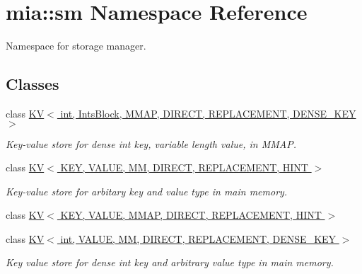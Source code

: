 \hypertarget{namespacemia_1_1sm}{\section{mia\-:\-:sm Namespace Reference}
\label{namespacemia_1_1sm}
}


Namespace for storage manager.  


\subsection*{Classes}
\begin{DoxyCompactItemize}
\item 
class \hyperlink{classmia_1_1sm_1_1_k_v_3_01int_00_01_ints_block_00_01_m_m_a_p_00_01_d_i_r_e_c_t_00_01_r_e_p_l_a_e377a0951ed37be3b4316b2929369f72}{K\-V$<$ int, Ints\-Block, M\-M\-A\-P, D\-I\-R\-E\-C\-T, R\-E\-P\-L\-A\-C\-E\-M\-E\-N\-T, D\-E\-N\-S\-E\-\_\-\-K\-E\-Y $>$}
\begin{DoxyCompactList}\small\item\em Key-\/value store for dense int key, variable length value, in M\-M\-A\-P. \end{DoxyCompactList}\item 
class \hyperlink{classmia_1_1sm_1_1_k_v_3_01_k_e_y_00_01_v_a_l_u_e_00_01_m_m_00_01_d_i_r_e_c_t_00_01_r_e_p_l_a_c_e_m_e_n_t_00_01_h_i_n_t_01_4}{K\-V$<$ K\-E\-Y, V\-A\-L\-U\-E, M\-M, D\-I\-R\-E\-C\-T, R\-E\-P\-L\-A\-C\-E\-M\-E\-N\-T, H\-I\-N\-T $>$}
\begin{DoxyCompactList}\small\item\em Key-\/value store for arbitary key and value type in main memory. \end{DoxyCompactList}\item 
class \hyperlink{classmia_1_1sm_1_1_k_v_3_01_k_e_y_00_01_v_a_l_u_e_00_01_m_m_a_p_00_01_d_i_r_e_c_t_00_01_r_e_p_l_2c35447e93d2a07c32ca67010a09264b}{K\-V$<$ K\-E\-Y, V\-A\-L\-U\-E, M\-M\-A\-P, D\-I\-R\-E\-C\-T, R\-E\-P\-L\-A\-C\-E\-M\-E\-N\-T, H\-I\-N\-T $>$}
\item 
class \hyperlink{classmia_1_1sm_1_1_k_v_3_01int_00_01_v_a_l_u_e_00_01_m_m_00_01_d_i_r_e_c_t_00_01_r_e_p_l_a_c_e_mff62509bd7761c1266e42e615210b694}{K\-V$<$ int, V\-A\-L\-U\-E, M\-M, D\-I\-R\-E\-C\-T, R\-E\-P\-L\-A\-C\-E\-M\-E\-N\-T, D\-E\-N\-S\-E\-\_\-\-K\-E\-Y $>$}
\begin{DoxyCompactList}\small\item\em Key value store for dense int key and arbitrary value type in main memory. \end{DoxyCompactList}\item 

\end{DoxyCompactItemize}
